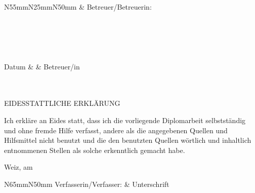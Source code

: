 \begin{titlepage}
	\titleHead
	\vspace{40mm}

	\begin{center}
		{\Huge\sffamily\typeOfWork\par}
		\vspace{5mm}
		{\LARGE\mytitle\par}
	\end{center}

	\vfill
	\begin{flushright}
		\begin{tabular}{N{55mm}N{25mm}N{50mm}}
			&  Betreuer/Betreuerin: \\
			\\
			\titleInsertCandidates \\
			 \\ \\ \hline
			 \\
			Datum			&  					& Betreuer/in \\ \\ \\ 
		\end{tabular}
	\end{flushright}
\end{titlepage}

\thispagestyle{empty}
	\titleHead
	\vspace{30mm}

	\begin{center}
	{\Huge\sffamily EIDESSTATTLICHE ERKLÄRUNG\par}
	\vspace{5mm}
	\parbox{.55\textheight}
		{Ich erkläre an Eides statt, dass ich die vorliegende Diplomarbeit selbstständig und ohne fremde Hilfe verfasst, 
		andere als die angegebenen Quellen und Hilfsmittel nicht benutzt 
		und die den benutzten Quellen wörtlich und inhaltlich entnommenen Stellen als solche erkenntlich gemacht habe.}
	\end{center}
	\vspace{15mm}
	Weiz, am \dateOfSubmission\\
	\begin{tabular}{N{65mm}N{50mm}}
		Verfasserin/Verfasser:		& Unterschrift \\
		\titleBackInsertCandidates
	\end{tabular}
	\unstretchTableRows
\clearpage